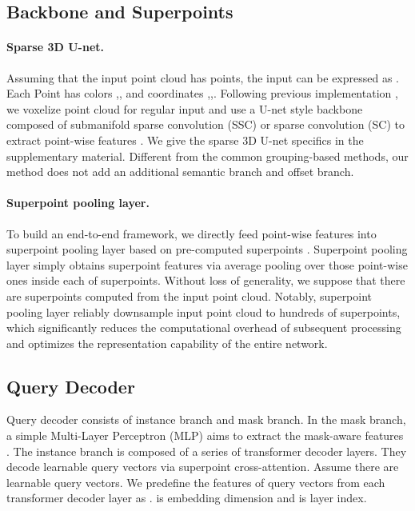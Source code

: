 \documentclass[letterpaper]{article} \usepackage{aaai23}  \usepackage{times}  \usepackage{helvet}  \usepackage{courier}  \usepackage[hyphens]{url}  \usepackage{graphicx} \urlstyle{rm} \def\UrlFont{\rm}  \usepackage{natbib}  \usepackage{caption} \frenchspacing  \setlength{\pdfpagewidth}{8.5in}  \setlength{\pdfpageheight}{11in}  \usepackage{algorithm}
\begin{document}
\subsection{Backbone and Superpoints}
\label{sec:backbone}
\paragraph{Sparse 3D U-net.} Assuming that the input point cloud has  points, the input can be expressed as . Each Point has colors ,, and coordinates ,,. Following previous implementation \cite{spconv-unet}, we voxelize point cloud for regular input and use a U-net style backbone composed of submanifold sparse convolution (SSC) or sparse convolution (SC) to extract point-wise features . We give the sparse 3D U-net specifics in the supplementary material. Different from the common grouping-based methods, our method does not add an additional semantic branch and offset branch. 

\paragraph{Superpoint pooling layer.} To build an end-to-end framework, we directly feed point-wise features  into superpoint pooling layer based on pre-computed superpoints \cite{superpoint}. Superpoint pooling layer simply obtains superpoint features  via average pooling over those point-wise ones inside each of superpoints. Without loss of generality, we suppose that there are  superpoints computed from the input point cloud. Notably, superpoint pooling layer reliably downsample input point cloud to hundreds of superpoints, which significantly reduces the computational overhead of subsequent processing and optimizes the representation capability of the entire network.

\subsection{Query Decoder}
\label{sec:query decoder}
Query decoder consists of instance branch and mask branch. In the mask branch, a simple Multi-Layer Perceptron (MLP) aims to extract the mask-aware features . The instance branch is composed of a series of transformer decoder layers. They decode learnable query vectors via superpoint cross-attention. Assume there are  learnable query vectors. We predefine the features of query vectors from each transformer decoder layer as .  is embedding dimension and  is layer index. 
\end{document}
